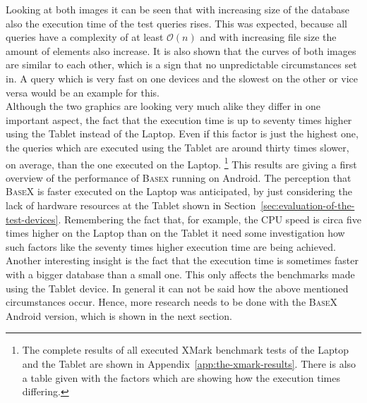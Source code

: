 Looking at both images it can be seen that with increasing size of the database also the execution time of the test queries rises.
This was expected, because all queries have a complexity of at least $\mathcal O(n)$ and with increasing file size the amount of elements also increase.
It is also shown that the curves of both images are similar to each other, which is a sign that no unpredictable circumstances set in.
A query which is very fast on one devices and the slowest on the other or vice versa would be an example for this.\\
Although the two graphics are looking very much alike they differ in one important aspect, the fact that the execution time is up to seventy times higher using the Tablet instead of the Laptop.
Even if this factor is just the highest one, the queries which are executed using the Tablet are around thirty times slower, on average, than the one executed on the Laptop.
\footnote{The complete results of all executed XMark benchmark tests of the Laptop and the Tablet are shown in Appendix~\ref{app:the-xmark-results}. There is also a table given with the factors which are showing how the execution times differing.}
This results are giving a first overview of the performance of \textsc{Basex} running on Android.
The perception that \textsc{BaseX} is faster executed on the Laptop was anticipated, by just considering the lack of hardware resources at the Tablet shown in Section~\ref{sec:evaluation-of-the-test-devices}.
Remembering the fact that, for example, the CPU speed is circa five times higher on the Laptop than on the Tablet it need some investigation how such factors like the seventy times higher execution time are being achieved.
Another interesting insight is the fact that the execution time is sometimes faster with a bigger database than a small one.
This only affects the benchmarks made using the Tablet device.
In general it can not be said how the above mentioned circumstances occur.
Hence, more research needs to be done with the \textsc{BaseX} Android version, which is shown in the next section.

